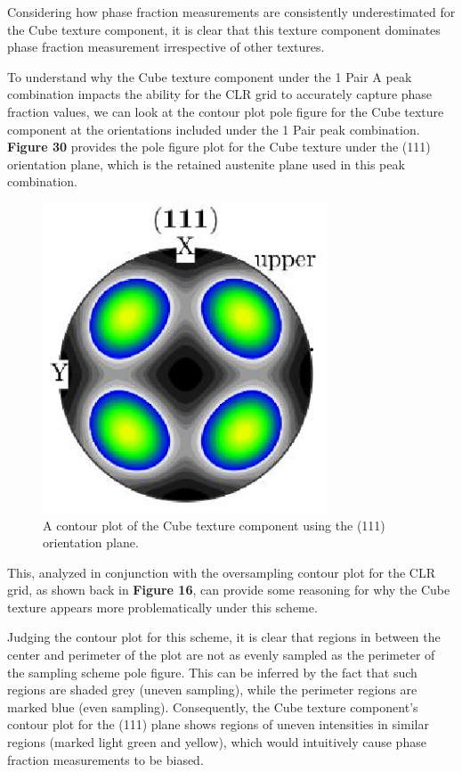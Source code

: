 \documentclass[10pt]{article}
\begin{document}
Considering how phase fraction measurements are consistently underestimated for the Cube texture component, it is clear that this texture component
dominates phase fraction measurement irrespective of other textures. 

To understand why the Cube texture component under the 1 Pair A peak combination impacts the ability for the CLR grid to accurately 
capture phase fraction values, we can look at the contour plot pole figure for the Cube texture component at the orientations included under 
the 1 Pair peak combination. \textbf{Figure 30} provides the pole figure plot for the Cube texture under the (111) orientation plane, which is the retained 
austenite plane used in this peak combination.
\begin{figure}[h]
    \centering
    \includegraphics[width=8.5cm]{fig30}
    \caption{\label{tab1}A contour plot of the Cube texture component using the (111) orientation plane.} 
    \end{figure}

This, analyzed in conjunction with the oversampling contour plot for the CLR grid, as shown back in \textbf{Figure 16}, can provide some reasoning for why the Cube texture 
appears more problematically under this scheme.

Judging the contour plot for this scheme, it is clear that regions in between the center and perimeter of the plot are not as evenly sampled as the perimeter of the 
sampling scheme pole figure. This can be inferred by the fact that such regions are shaded grey (uneven sampling), while the perimeter regions are marked blue (even sampling).
Consequently, the Cube texture component's contour plot for the (111) plane shows regions of uneven intensities in similar regions (marked light green and yellow), which would intuitively cause 
phase fraction measurements to be biased. 
\end{document}
